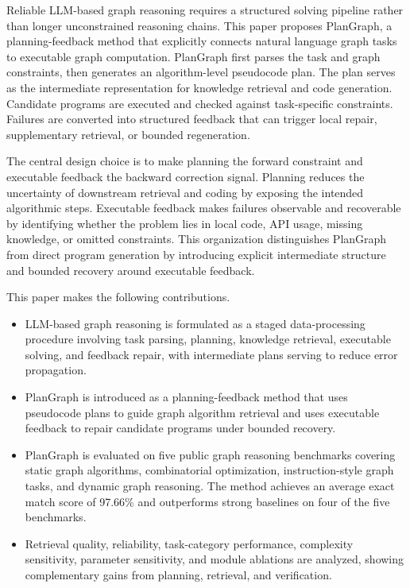 \documentclass[pdflatex,sn-mathphys-num]{sn-jnl}
\theoremstyle{thmstyleone}
\theoremstyle{thmstyletwo}
\theoremstyle{thmstylethree}
\begin{document}
Reliable LLM-based graph reasoning requires a structured solving pipeline rather than longer unconstrained reasoning chains. This paper proposes PlanGraph, a planning-feedback method that explicitly connects natural language graph tasks to executable graph computation. PlanGraph first parses the task and graph constraints, then generates an algorithm-level pseudocode plan. The plan serves as the intermediate representation for knowledge retrieval and code generation. Candidate programs are executed and checked against task-specific constraints. Failures are converted into structured feedback that can trigger local repair, supplementary retrieval, or bounded regeneration.

The central design choice is to make planning the forward constraint and executable feedback the backward correction signal. Planning reduces the uncertainty of downstream retrieval and coding by exposing the intended algorithmic steps. Executable feedback makes failures observable and recoverable by identifying whether the problem lies in local code, API usage, missing knowledge, or omitted constraints. This organization distinguishes PlanGraph from direct program generation by introducing explicit intermediate structure and bounded recovery around executable feedback.

This paper makes the following contributions.
\begin{itemize}
\item LLM-based graph reasoning is formulated as a staged data-processing procedure involving task parsing, planning, knowledge retrieval, executable solving, and feedback repair, with intermediate plans serving to reduce error propagation.
\item PlanGraph is introduced as a planning-feedback method that uses pseudocode plans to guide graph algorithm retrieval and uses executable feedback to repair candidate programs under bounded recovery.
\item PlanGraph is evaluated on five public graph reasoning benchmarks covering static graph algorithms, combinatorial optimization, instruction-style graph tasks, and dynamic graph reasoning. The method achieves an average exact match score of 97.66\% and outperforms strong baselines on four of the five benchmarks.
\item Retrieval quality, reliability, task-category performance, complexity sensitivity, parameter sensitivity, and module ablations are analyzed, showing complementary gains from planning, retrieval, and verification.
\end{itemize}
\end{document}
